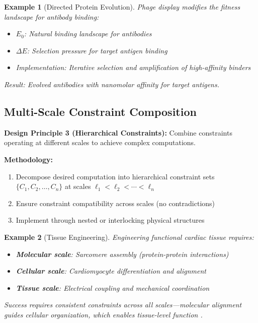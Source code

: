 \documentclass[11pt]{article}
\newtheorem{example}{Example}
\begin{document}
\begin{example}[Directed Protein Evolution]
Phage display modifies the fitness landscape for antibody binding:
\begin{itemize}
\item $E_0$: Natural binding landscape for antibodies
\item $\Delta E$: Selection pressure for target antigen binding
\item Implementation: Iterative selection and amplification of high-affinity binders
\end{itemize}
Result: Evolved antibodies with nanomolar affinity for target antigens.
\end{example}

\subsection{Multi-Scale Constraint Composition}

\textbf{Design Principle 3 (Hierarchical Constraints):} Combine constraints operating at different scales to achieve complex computations.

\textbf{Methodology:}
\begin{enumerate}
\item Decompose desired computation into hierarchical constraint sets $\{C_1, C_2, \ldots, C_n\}$ at scales $\ell_1 < \ell_2 < \cdots < \ell_n$
\item Ensure constraint compatibility across scales (no contradictions)
\item Implement through nested or interlocking physical structures
\end{enumerate}

\begin{example}[Tissue Engineering]
Engineering functional cardiac tissue requires:
\begin{itemize}
\item \textbf{Molecular scale}: Sarcomere assembly (protein-protein interactions)
\item \textbf{Cellular scale}: Cardiomyocyte differentiation and alignment
\item \textbf{Tissue scale}: Electrical coupling and mechanical coordination
\end{itemize}
Success requires consistent constraints across all scales—molecular alignment guides cellular organization, which enables tissue-level function \citep{ott2008perfusion}.
\end{example}
\end{document}
